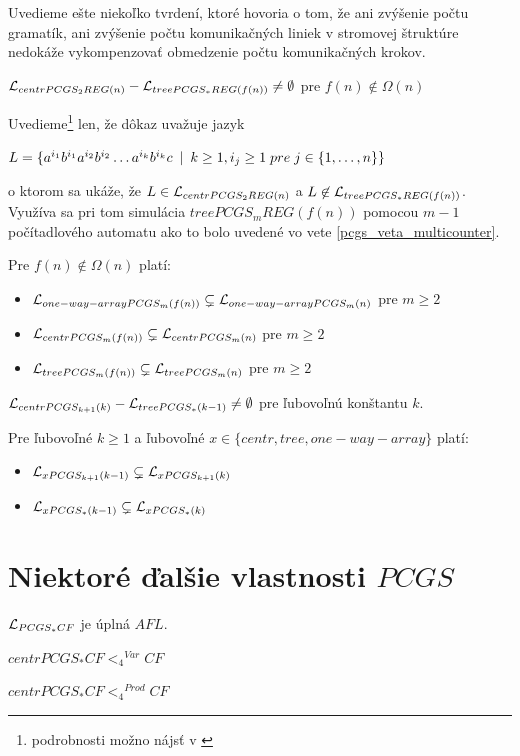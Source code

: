 Uvedieme ešte niekoľko tvrdení, ktoré hovoria o tom, že ani
zvýšenie počtu gramatík, ani zvýšenie počtu komunikačných liniek v
stromovej štruktúre nedokáže vykompenzovať obmedzenie počtu
komunikačných krokov.

\begin{veta}
  $\mathcal{L}_{centrPCGS_2 REG(n)} - 
    \mathcal{L}_{treePCGS_* REG(f(n))} \neq\emptyset$
  pre $f(n)\not\in\Omega (n)$
\end{veta}

\begin{dokaz}
  Uvedieme\footnote{podrobnosti možno nájsť v \cite{some}} len, že
  dôkaz uvažuje jazyk \newline \centerline{$L=\{
  a^{i_1}b^{i_1}a^{i_2}b^{i_2}\dots a^{i_k}b^{i_k}c\enspace |\enspace k\geq 1,
  i_j\geq 1\; pre\; j\in\{ 1,\dots ,n\}\}$} o ktorom sa ukáže, že
  $L \in \mathcal{L}_{centrPCGS_2 REG(n)}$ a
  $L \not\in \mathcal{L}_{treePCGS_* REG(f(n))}$. Využíva sa pri tom
  simulácia $treePCGS_mREG(f(n))$ pomocou $m-1$ počítadlového
  automatu ako to bolo uvedené vo vete \ref{pcgs_veta_multicounter}.
\end{dokaz}

\begin{veta}
  Pre $f(n)\not\in\Omega (n)$ platí:
  \begin{itemize}
    \item $\mathcal{L}_{one-way-array PCGS_m(f(n))} \subsetneq
          \mathcal{L}_{one-way-array PCGS_m(n)}$
    pre $m\geq 2$
    \item $\mathcal{L}_{centrPCGS_m(f(n))} \subsetneq
      \mathcal{L}_{centrPCGS_m(n)}$
    pre $m\geq 2$
    \item $\mathcal{L}_{treePCGS_m(f(n))} \subsetneq
      \mathcal{L}_{treePCGS_m(n)}$
    pre $m\geq 2$
  \end{itemize}
\end{veta}

\begin{veta}
  $\mathcal{L}_{centrPCGS_{k+1}(k)}-\mathcal{L}_{treePCGS_*(k-1)}\neq\emptyset$
  pre ľubovoľnú konštantu $k$.
\end{veta}

\begin{veta}
  Pre ľubovoľné $k\geq 1$ a ľubovoľné
  $x\in\{centr,tree,one-way-array\}$ platí:
  \begin{itemize}
    \item
    $\mathcal{L}_{xPCGS_{k+1}(k-1)}\subsetneq\mathcal{L}_{xPCGS_{k+1}(k)}$
    \item $\mathcal{L}_{xPCGS_*(k-1)}\subsetneq\mathcal{L}_{xPCGS_*(k)}$
  \end{itemize}
\end{veta}

\section{Niektoré ďalšie vlastnosti $PCGS$}

\begin{veta}
  $\mathcal{L}_{PCGS_* CF}$ je úplná $AFL$.
\end{veta}

\begin{veta}
  $centrPCGS_*CF {<_4}^{Var} CF$
\end{veta}

\begin{veta}
  $centrPCGS_*CF {<_4}^{Prod} CF$
\end{veta}

